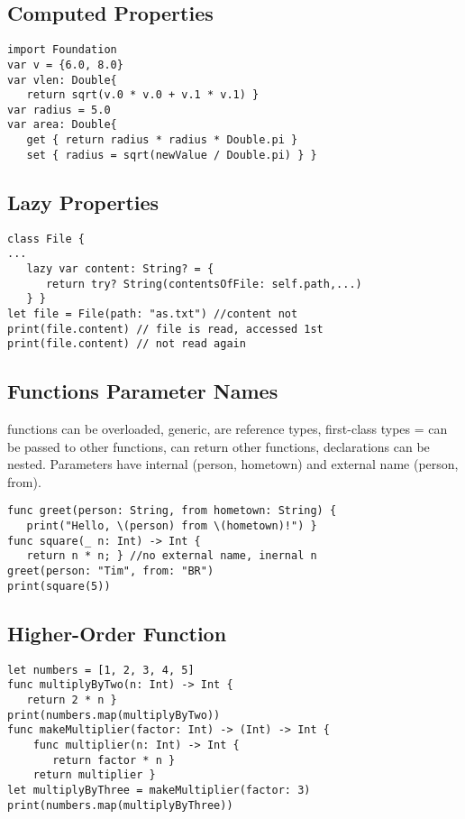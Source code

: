 \subsection{Computed Properties}
\begin{lstlisting}
import Foundation
var v = {6.0, 8.0}
var vlen: Double{
   return sqrt(v.0 * v.0 + v.1 * v.1) }
var radius = 5.0
var area: Double{
   get { return radius * radius * Double.pi }
   set { radius = sqrt(newValue / Double.pi) } }
\end{lstlisting}

\subsection{Lazy Properties}
\begin{lstlisting}
class File {
...
   lazy var content: String? = {
      return try? String(contentsOfFile: self.path,...)
   } }
let file = File(path: "as.txt") //content not
print(file.content) // file is read, accessed 1st
print(file.content) // not read again
\end{lstlisting}

\subsection{Functions Parameter Names}
functions can be overloaded, generic, are reference types, first-class types = can be passed to other functions, can return other functions, declarations can be nested. Parameters have internal (person, hometown) and external name (person, from).
\begin{lstlisting}
func greet(person: String, from hometown: String) {
   print("Hello, \(person) from \(hometown)!") }
func square(_ n: Int) -> Int {
   return n * n; } //no external name, inernal n
greet(person: "Tim", from: "BR")
print(square(5))
\end{lstlisting}

\subsection{Higher-Order Function}
\begin{lstlisting}
let numbers = [1, 2, 3, 4, 5]
func multiplyByTwo(n: Int) -> Int {
   return 2 * n }
print(numbers.map(multiplyByTwo))
func makeMultiplier(factor: Int) -> (Int) -> Int {
	func multiplier(n: Int) -> Int {
	   return factor * n }
	return multiplier }
let multiplyByThree = makeMultiplier(factor: 3)
print(numbers.map(multiplyByThree))
\end{lstlisting}

